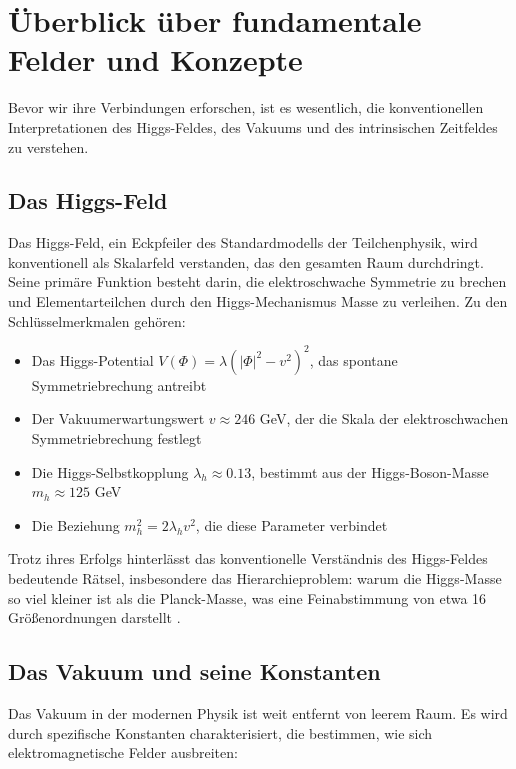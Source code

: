 \documentclass[12pt,a4paper]{article}
\begin{document}
	\section{Überblick über fundamentale Felder und Konzepte}
	\label{sec:fields_overview}
	
	Bevor wir ihre Verbindungen erforschen, ist es wesentlich, die konventionellen Interpretationen des Higgs-Feldes, des Vakuums und des intrinsischen Zeitfeldes zu verstehen.
	
	\subsection{Das Higgs-Feld}
	\label{subsec:higgs_field}
	
	Das Higgs-Feld, ein Eckpfeiler des Standardmodells der Teilchenphysik, wird konventionell als Skalarfeld verstanden, das den gesamten Raum durchdringt. Seine primäre Funktion besteht darin, die elektroschwache Symmetrie zu brechen und Elementarteilchen durch den Higgs-Mechanismus Masse zu verleihen. Zu den Schlüsselmerkmalen gehören:
	
	\begin{itemize}
		\item Das Higgs-Potential $V(\Phi) = \lambda(|\Phi|^2 - v^2)^2$, das spontane Symmetriebrechung antreibt
		\item Der Vakuumerwartungswert $v \approx 246$ GeV, der die Skala der elektroschwachen Symmetriebrechung festlegt
		\item Die Higgs-Selbstkopplung $\lambda_h \approx 0.13$, bestimmt aus der Higgs-Boson-Masse $m_h \approx 125$ GeV
		\item Die Beziehung $m_h^2 = 2\lambda_h v^2$, die diese Parameter verbindet
	\end{itemize}
	
	Trotz ihres Erfolgs hinterlässt das konventionelle Verständnis des Higgs-Feldes bedeutende Rätsel, insbesondere das Hierarchieproblem: warum die Higgs-Masse so viel kleiner ist als die Planck-Masse, was eine Feinabstimmung von etwa 16 Größenordnungen darstellt \cite{Weinberg1989}.
	
	\subsection{Das Vakuum und seine Konstanten}
	\label{subsec:vacuum}
	
	Das Vakuum in der modernen Physik ist weit entfernt von leerem Raum. Es wird durch spezifische Konstanten charakterisiert, die bestimmen, wie sich elektromagnetische Felder ausbreiten:
	
\end{document}
